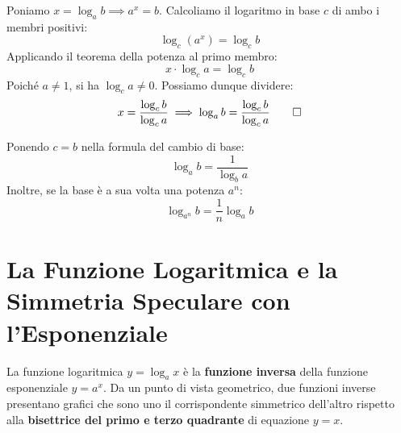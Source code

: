\documentclass[11pt,a4paper,oneside]{report}
\begin{document}
\begin{dimostrazione}
Poniamo $x = \log_a b \implies a^x = b$.
Calcoliamo il logaritmo in base $c$ di ambo i membri positivi:
\begin{equation}
    \log_c (a^x) = \log_c b
\end{equation}
Applicando il teorema della potenza al primo membro:
\begin{equation}
    x \cdot \log_c a = \log_c b
\end{equation}
Poiché $a \neq 1$, si ha $\log_c a \neq 0$. Possiamo dunque dividere:
\begin{equation}
    x = \frac{\log_c b}{\log_c a} \implies \log_a b = \frac{\log_c b}{\log_c a} \qedhere
\end{equation}
\end{dimostrazione}

\begin{corollario}
Ponendo $c = b$ nella formula del cambio di base:
\begin{equation}
    \log_a b = \frac{1}{\log_b a}
\end{equation}
Inoltre, se la base è a sua volta una potenza $a^n$:
\begin{equation}
    \log_{a^n} b = \frac{1}{n} \log_a b
\end{equation}
\end{corollario}

\section{La Funzione Logaritmica e la Simmetria Speculare con l'Esponenziale}
La funzione logaritmica $y = \log_a x$ è la \textbf{funzione inversa} della funzione esponenziale $y = a^x$.
Da un punto di vista geometrico, due funzioni inverse presentano grafici che sono uno il corrispondente simmetrico dell'altro rispetto alla \textbf{bisettrice del primo e terzo quadrante} di equazione $y = x$.
\end{document}

